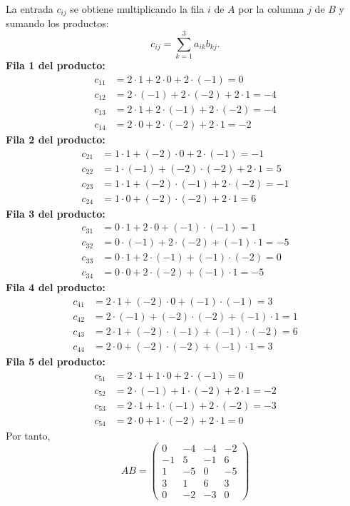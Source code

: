 \documentclass[12pt]{article}
\theoremstyle{remark}
\begin{document}
La entrada $c_{ij}$ se obtiene multiplicando la fila $i$ de $A$ por la columna $j$ de $B$ y sumando los productos:
\[
c_{ij}=\sum_{k=1}^{3} a_{ik}b_{kj}.
\]
\textbf{Fila 1 del producto:}
\[
\begin{aligned}c_{11}&=2\cdot 1+2\cdot 0+2\cdot (-1)=0\\c_{12}&=2\cdot (-1)+2\cdot (-2)+2\cdot 1=-4\\c_{13}&=2\cdot 1+2\cdot (-1)+2\cdot (-2)=-4\\c_{14}&=2\cdot 0+2\cdot (-2)+2\cdot 1=-2\end{aligned}
\]
\textbf{Fila 2 del producto:}
\[
\begin{aligned}c_{21}&=1\cdot 1+(-2)\cdot 0+2\cdot (-1)=-1\\c_{22}&=1\cdot (-1)+(-2)\cdot (-2)+2\cdot 1=5\\c_{23}&=1\cdot 1+(-2)\cdot (-1)+2\cdot (-2)=-1\\c_{24}&=1\cdot 0+(-2)\cdot (-2)+2\cdot 1=6\end{aligned}
\]
\textbf{Fila 3 del producto:}
\[
\begin{aligned}c_{31}&=0\cdot 1+2\cdot 0+(-1)\cdot (-1)=1\\c_{32}&=0\cdot (-1)+2\cdot (-2)+(-1)\cdot 1=-5\\c_{33}&=0\cdot 1+2\cdot (-1)+(-1)\cdot (-2)=0\\c_{34}&=0\cdot 0+2\cdot (-2)+(-1)\cdot 1=-5\end{aligned}
\]
\textbf{Fila 4 del producto:}
\[
\begin{aligned}c_{41}&=2\cdot 1+(-2)\cdot 0+(-1)\cdot (-1)=3\\c_{42}&=2\cdot (-1)+(-2)\cdot (-2)+(-1)\cdot 1=1\\c_{43}&=2\cdot 1+(-2)\cdot (-1)+(-1)\cdot (-2)=6\\c_{44}&=2\cdot 0+(-2)\cdot (-2)+(-1)\cdot 1=3\end{aligned}
\]
\textbf{Fila 5 del producto:}
\[
\begin{aligned}c_{51}&=2\cdot 1+1\cdot 0+2\cdot (-1)=0\\c_{52}&=2\cdot (-1)+1\cdot (-2)+2\cdot 1=-2\\c_{53}&=2\cdot 1+1\cdot (-1)+2\cdot (-2)=-3\\c_{54}&=2\cdot 0+1\cdot (-2)+2\cdot 1=0\end{aligned}
\]
Por tanto,
\[
\boxed{AB=\begin{pmatrix}0&-4&-4&-2\\-1&5&-1&6\\1&-5&0&-5\\3&1&6&3\\0&-2&-3&0\end{pmatrix}}
\]
\end{document}
